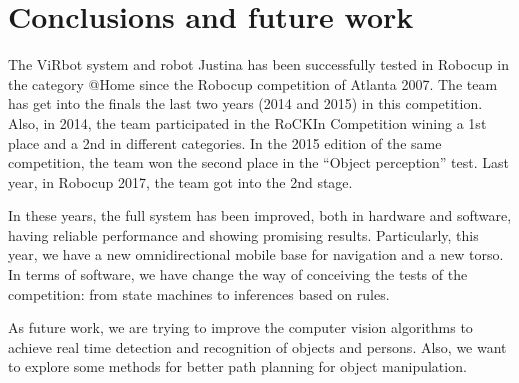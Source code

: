 \documentclass{llncs}
\begin{document}

\section{Conclusions and future work}\label{sec:conclusions}

The ViRbot system and robot Justina has been successfully tested in Robocup in the category @Home since the Robocup competition of Atlanta 2007. The team has get into the finals the last two years (2014 and 2015) in this competition. Also, in 2014, the team participated in the RoCKIn Competition wining a 1st place and a 2nd in different categories. In the 2015 edition of the same competition, the team won the second place in the ``Object perception'' test. Last year, in Robocup 2017, the team got into the 2nd stage.

In these years, the full system has been improved, both in hardware and software, having reliable performance and showing promising results. Particularly, this year, we have a new omnidirectional mobile base for navigation and a new torso. In terms of software, we have change the way of conceiving the tests of the competition: from state machines to inferences based on rules.  

As future work, we are trying to improve the computer vision algorithms to achieve real time detection and recognition of objects and persons. Also, we want to explore some methods for better path planning for object manipulation.




\end{document}
